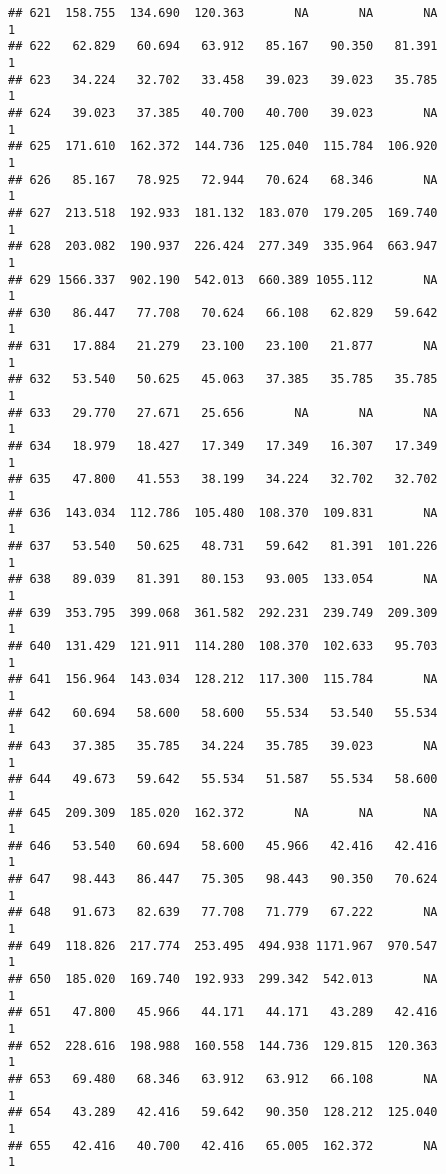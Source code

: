 \documentclass[
]{article}
\begin{document}
\begin{verbatim}
## 621  158.755  134.690  120.363       NA       NA       NA             1
## 622   62.829   60.694   63.912   85.167   90.350   81.391             1
## 623   34.224   32.702   33.458   39.023   39.023   35.785             1
## 624   39.023   37.385   40.700   40.700   39.023       NA             1
## 625  171.610  162.372  144.736  125.040  115.784  106.920             1
## 626   85.167   78.925   72.944   70.624   68.346       NA             1
## 627  213.518  192.933  181.132  183.070  179.205  169.740             1
## 628  203.082  190.937  226.424  277.349  335.964  663.947             1
## 629 1566.337  902.190  542.013  660.389 1055.112       NA             1
## 630   86.447   77.708   70.624   66.108   62.829   59.642             1
## 631   17.884   21.279   23.100   23.100   21.877       NA             1
## 632   53.540   50.625   45.063   37.385   35.785   35.785             1
## 633   29.770   27.671   25.656       NA       NA       NA             1
## 634   18.979   18.427   17.349   17.349   16.307   17.349             1
## 635   47.800   41.553   38.199   34.224   32.702   32.702             1
## 636  143.034  112.786  105.480  108.370  109.831       NA             1
## 637   53.540   50.625   48.731   59.642   81.391  101.226             1
## 638   89.039   81.391   80.153   93.005  133.054       NA             1
## 639  353.795  399.068  361.582  292.231  239.749  209.309             1
## 640  131.429  121.911  114.280  108.370  102.633   95.703             1
## 641  156.964  143.034  128.212  117.300  115.784       NA             1
## 642   60.694   58.600   58.600   55.534   53.540   55.534             1
## 643   37.385   35.785   34.224   35.785   39.023       NA             1
## 644   49.673   59.642   55.534   51.587   55.534   58.600             1
## 645  209.309  185.020  162.372       NA       NA       NA             1
## 646   53.540   60.694   58.600   45.966   42.416   42.416             1
## 647   98.443   86.447   75.305   98.443   90.350   70.624             1
## 648   91.673   82.639   77.708   71.779   67.222       NA             1
## 649  118.826  217.774  253.495  494.938 1171.967  970.547             1
## 650  185.020  169.740  192.933  299.342  542.013       NA             1
## 651   47.800   45.966   44.171   44.171   43.289   42.416             1
## 652  228.616  198.988  160.558  144.736  129.815  120.363             1
## 653   69.480   68.346   63.912   63.912   66.108       NA             1
## 654   43.289   42.416   59.642   90.350  128.212  125.040             1
## 655   42.416   40.700   42.416   65.005  162.372       NA             1

\end{verbatim}
\end{document}
